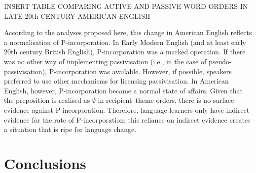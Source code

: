 	INSERT TABLE COMPARING ACTIVE AND PASSIVE WORD ORDERS IN LATE 20th CENTURY AMERICAN ENGLISH

	According to the analyses proposed here, this change in American English reflects a normalisation of P-incorporation. In Early Modern English (and at least early 20th century British English), P-incorporation was a marked operation. If there was no other way of implementing passivisation (i.e., in the case of pseudo-passivisation), P-incorporation was available. However, if possible, speakers preferred to use other mechanisms for licensing passivisation. In American English, however, P-incorporation became a normal state of affairs. Given that the preposition is realised as $\emptyset$ in recipient--theme orders, there is no surface evidence against P-incorporation. Therefore, language learners only have indirect evidence for the rate of P-incorporation; this reliance on indirect evidence creates a situation that is ripe for language change.

\section{Conclusions}


